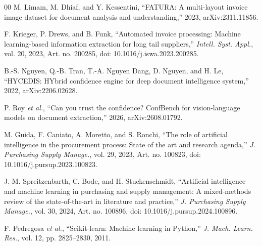 \documentclass[conference]{IEEEtran}
\begin{document}
\begin{thebibliography}{00}
M. Limam, M. Dhiaf, and Y. Kessentini, ``FATURA: A multi-layout invoice image
dataset for document analysis and understanding,'' 2023, arXiv:2311.11856.

F. Krieger, P. Drews, and B. Funk, ``Automated invoice processing: Machine
learning-based information extraction for long tail suppliers,''
\emph{Intell. Syst. Appl.}, vol. 20, 2023, Art. no. 200285,
doi: 10.1016/j.iswa.2023.200285.

B.-S. Nguyen, Q.-B. Tran, T.-A. Nguyen Dang, D. Nguyen, and H. Le, ``HYCEDIS:
HYbrid confidence engine for deep document intelligence system,'' 2022,
arXiv:2206.02628.

P. Roy \emph{et al.}, ``Can you trust the confidence? ConfBench for
vision-language models on document extraction,'' 2026, arXiv:2608.01792.

M. Guida, F. Caniato, A. Moretto, and S. Ronchi, ``The role of artificial
intelligence in the procurement process: State of the art and research agenda,''
\emph{J. Purchasing Supply Manage.}, vol. 29, 2023, Art. no. 100823,
doi: 10.1016/j.pursup.2023.100823.

J. M. Spreitzenbarth, C. Bode, and H. Stuckenschmidt, ``Artificial intelligence
and machine learning in purchasing and supply management: A mixed-methods review
of the state-of-the-art in literature and practice,'' \emph{J. Purchasing Supply
Manage.}, vol. 30, 2024, Art. no. 100896, doi: 10.1016/j.pursup.2024.100896.

F. Pedregosa \emph{et al.}, ``Scikit-learn: Machine learning in Python,''
\emph{J. Mach. Learn. Res.}, vol. 12, pp. 2825--2830, 2011.

\end{thebibliography}
\end{document}
